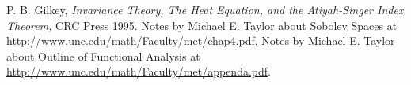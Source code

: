 \documentclass[10pt]{article} %
\begin{document}
\begin{thebibliography}{9}
	P. B. Gilkey, {\it Invariance Theory, The Heat Equation, and the Atiyah-Singer Index Theorem,} CRC Press 1995.
	Notes by Michael E. Taylor about Sobolev Spaces at \url{http://www.unc.edu/math/Faculty/met/chap4.pdf}.
	Notes by Michael E. Taylor about Outline of Functional Analysis
		at \url{http://www.unc.edu/math/Faculty/met/appenda.pdf}.
\end{thebibliography}
\end{document}
